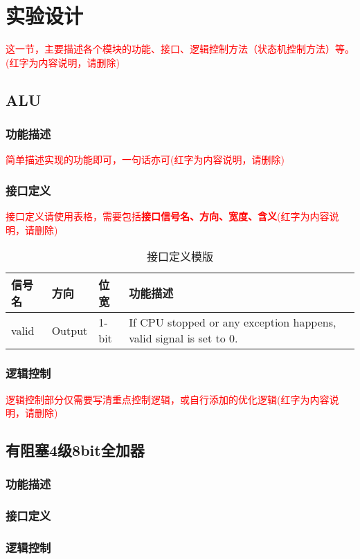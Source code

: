 \section{实验设计}
\textcolor{red}{这一节，主要描述各个模块的功能、接口、逻辑控制方法（状态机控制方法）等。(红字为内容说明，请删除)}
\subsection{ALU}\label{sub:alu}
\subsubsection{功能描述}
\textcolor{red}{简单描述实现的功能即可，一句话亦可(红字为内容说明，请删除)}
\subsubsection{接口定义}
\textcolor{red}{接口定义请使用表格，需要包括\textbf{接口信号名、方向、宽度、含义}(红字为内容说明，请删除)}

\begin{table}[htp]
\caption{接口定义模版}\label{tab:signaldef}
\begin{center}
	\begin{tabular}{|l|l|l|p{6cm}|}
	\hline
	\textbf{信号名} & \textbf{方向} & \textbf{位宽} & \textbf{功能描述}\\ \hline \hline
	valid			& Output& 1-bit & If CPU stopped or any exception happens, valid signal is set to 0.\\ 
	\hline
	\end{tabular}
\end{center}
\end{table}

\subsubsection{逻辑控制}
\textcolor{red}{逻辑控制部分仅需要写清重点控制逻辑，或自行添加的优化逻辑(红字为内容说明，请删除)}
\subsection{有阻塞4级8bit全加器}\label{sub:ctl}
\subsubsection{功能描述}
\subsubsection{接口定义}
\subsubsection{逻辑控制}
